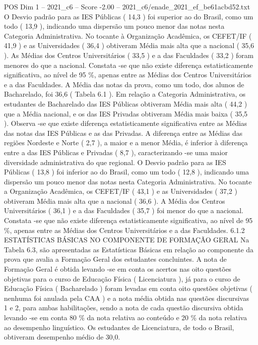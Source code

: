 \begin{textsample}{POS Dim 1 – 2021\_c6 – Score -2.00 – 2021\_c6/enade\_2021\_ef\_be61acbd52.txt}
O Desvio padrão para as IES Públicas ( 14,3 ) foi superior ao do Brasil, como um todo ( 13,9 ), indicando uma dispersão um pouco menor das notas nesta Categoria Administrativa.
No tocante à Organização Acadêmica, os CEFET/IF ( 41,9 ) e as Universidades ( 36,4 ) obtiveram Média mais alta que a nacional ( 35,6 ).
As Médias dos Centros Universitários ( 33,5 ) e a das Faculdades ( 33,2 ) foram menores do que a nacional.
Constata -se que não existe diferença estatisticamente significativa, ao nível de 95 \%, apenas entre as Médias dos Centros Universitários e a das Faculdades.
A Média das notas da prova, como um todo, dos alunos de Bacharelado, foi 36,6 ( Tabela 6.1 ).
Em relação a Categoria Administrativa, os estudantes de Bacharelado das IES Públicas obtiveram Média mais alta ( 44,2 ) que a Média nacional, e os das IES Privadas obtiveram Média mais baixa ( 35,5 ).
Observa -se que existe diferença estatisticamente significativa entre as Médias das notas das IES Públicas e as das Privadas.
A diferença entre as Médias das regiões Nordeste e Norte ( 2,7 ), a maior e a menor Média, é inferior à diferença entre a das IES Públicas e Privadas ( 8,7 ), caracterizando -se uma maior diversidade administrativa do que regional.
O Desvio padrão para as IES Públicas ( 13,8 ) foi inferior ao do Brasil, como um todo ( 12,8 ), indicando uma dispersão um pouco menor das notas nesta Categoria Administrativa.
No tocante a Organização Acadêmica, os CEFET/IF ( 43,1 ) e as Universidades ( 37,2 ) obtiveram Média mais alta que a nacional ( 36,6 ).
A Média dos Centros Universitários ( 36,1 ) e a das Faculdades ( 35,7 ) foi menor do que a nacional.
Constata -se que não existe diferença estatisticamente significativa, ao nível de 95 \%, apenas entre as Médias dos Centros Universitários e a das Faculdades. 6.1.2 ESTATÍSTICAS BÁSICAS NO COMPONENTE DE FORMAÇÃO GERAL Na Tabela 6.3, são apresentadas as Estatísticas Básicas em relação ao componente da prova que avalia a Formação Geral dos estudantes concluintes.
A nota de Formação Geral é obtida levando -se em conta os acertos nas oito questões objetivas para o curso de Educação Física ( Licenciatura ), já para o curso de Educação Física ( Bacharelado ) foram levadas em conta oito questões objetivas ( nenhuma foi anulada pela CAA ) e a nota média obtida nas questões discursivas 1 e 2, para ambas habilitações, sendo a nota de cada questão discursiva obtida levando -se em conta 80 \% da nota relativa ao conteúdo e 20 \% da nota relativa ao desempenho linguístico.
Os estudantes de Licenciatura, de todo o Brasil, obtiveram desempenho médio de 30,0.

\end{textsample}
